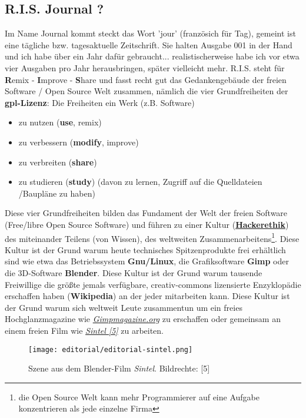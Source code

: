 \subsection*{R.I.S. Journal ?}
Im Name Journal kommt steckt das Wort 'jour' (französich für Tag), gemeint ist eine tägliche bzw. tagesaktuelle Zeitschrift. Sie halten Ausgabe 001 in der Hand und ich habe über ein Jahr dafür gebraucht... realistischerweise habe ich vor etwa vier Ausgaben pro Jahr herausbringen, später vielleicht mehr. R.I.S. steht für \textbf{R}emix - \textbf{I}mprove - \textbf{S}hare und fasst recht gut das Gedankengebäude der freien Software / Open Source Welt zusammen, nämlich die vier Grundfreiheiten der \textbf{gpl-Lizenz}: Die Freiheiten ein Werk (z.B. Software) 
\begin{itemize}
\item zu nutzen (\textbf{use}, remix)
\item zu verbessern (\textbf{modify}, improve)
\item zu verbreiten (\textbf{share})
\item zu studieren (\textbf{study}) (davon zu lernen, Zugriff auf die Quelldateien /Baupläne zu haben)
\end{itemize}

Diese vier Grundfreiheiten bilden das Fundament der Welt der freien Software (Free/libre Open Source Software) und führen zu einer Kultur (\href{http://en.wikipedia.org/wiki/Hacker_ethic}{\textbf{Hackerethik}}) des miteinander Teilens (von Wissen), des weltweiten Zusammenarbeitens\footnote{die Open Source Welt kann mehr Programmierer auf eine Aufgabe konzentrieren als jede einzelne Firma}. Diese Kultur ist der Grund warum heute technisches Spitzenprodukte frei erhältlich sind wie etwa das Betriebssystem \textbf{Gnu/Linux}, die Grafiksoftware \textbf{Gimp} oder die 3D-Software \textbf{Blender}. Diese Kultur ist der Grund warum tausende Freiwillige die größte jemals verfügbare, creativ-commons lizensierte Enzyklopädie erschaffen haben (\textbf{Wikipedia}) an der jeder mitarbeiten kann. Diese Kultur ist der Grund warum sich weltweit Leute zusammentun um ein freies Hochglanzmagazine wie \href{http://gimpmagazine.org/}{\textit{Gimpmagazine.org}} zu erschaffen oder gemeinsam an einem freien Film wie \href{http://www.sintel.org/}{\textit{Sintel [5]}} zu arbeiten. \\

\begin{figure}
\texttt{[image: editorial/editorial-sintel.png]}\\
\caption{Szene aus dem Blender-Film \emph{Sintel}. Bildrechte: [5]}
\end{figure}

